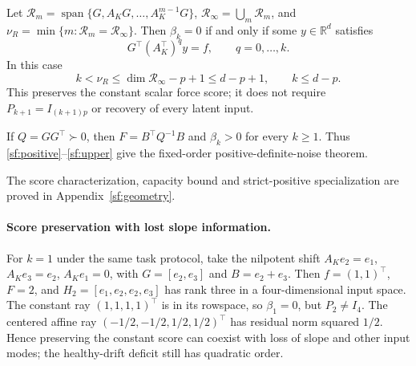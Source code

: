 \begin{proposition}\label{sf:capacity}
Let $\mathcal R_m=\operatorname{span}\{G,A_KG,\ldots,A_K^{m-1}G\}$,
$\mathcal R_\infty=\bigcup_m\mathcal R_m$, and
$\nu_R=\min\{m:\mathcal R_m=\mathcal R_\infty\}$.
Then $\beta_k=0$ if and only if some $y\in\mathbb R^d$ satisfies
\begin{equation}\label{sf:score}
G^\top(A_K^\top)^q y=f,\qquad q=0,\ldots,k.
\end{equation}
In this case
\begin{equation}\label{sf:capacity-bound}
k<\nu_R\le\dim\mathcal R_\infty-p+1\le d-p+1,
\qquad k\le d-p.
\end{equation}
This preserves the constant scalar force score; it does not require
$P_{k+1}=I_{(k+1)p}$ or recovery of every latent input.
\end{proposition}

\begin{corollary}\label{sf:spd}
If $Q=GG^\top\succ0$, then $F=B^\top Q^{-1}B$ and
$\beta_k>0$ for every $k\ge1$. Thus \eqref{sf:positive}--\eqref{sf:upper}
give the fixed-order positive-definite-noise theorem.
\end{corollary}
The score characterization, capacity bound and strict-positive specialization
are proved in Appendix~\ref{sf:geometry}.

\paragraph{Score preservation with lost slope information.}
For $k=1$ under the same task protocol, take the nilpotent shift
$A_Ke_2=e_1$, $A_Ke_3=e_2$, $A_Ke_1=0$, with
$G=[e_2,e_3]$ and $B=e_2+e_3$. Then $f=(1,1)^\top$, $F=2$, and
$H_2=[e_1,e_2,e_2,e_3]$ has rank three in a four-dimensional input space.
The constant ray $(1,1,1,1)^\top$ is in its rowspace, so $\beta_1=0$,
but $P_2\ne I_4$. The centered affine ray
$(-1/2,-1/2,1/2,1/2)^\top$ has residual norm squared $1/2$.
Hence preserving the constant score can coexist with loss of slope and other
input modes; the healthy-drift deficit still has quadratic order.

